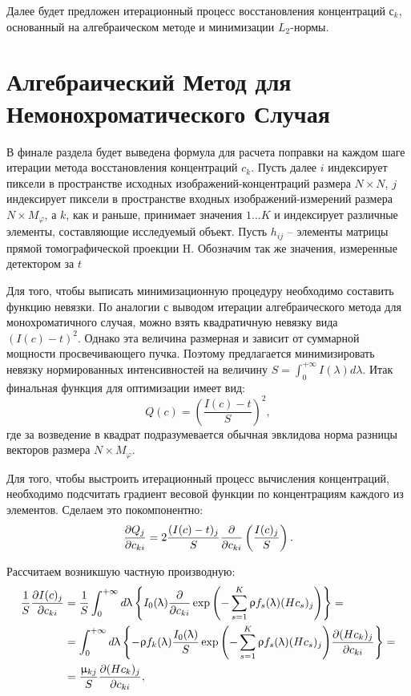 Далее будет предложен итерационный процесс восстановления концентраций $с_k$, основанный на алгебраическом методе и минимизации $L_2$-нормы.

\section{Алгебраический Метод для Немонохроматического Случая}

В финале раздела будет выведена формула для расчета поправки на каждом шаге итерации метода восстановления концентраций $c_k$.
Пусть далее $i$ индексирует пиксели в пространстве исходных изображений-концентраций размера $N \times N$, $j$ индексирует пиксели в пространстве входных изображений-измерений размера $N \times M_\varphi$, а $k$, как и раньше, принимает значения $1 \dots K$ и индексирует различные элементы, составляющие исследуемый объект.
Пусть $h_{ij}$ – элементы матрицы прямой томографической проекции H.
Обозначим так же значения, измеренные детектором за $t$

Для того, чтобы выписать минимизационную процедуру необходимо составить функцию невязки.
По аналогии с выводом итерации алгебраического метода для монохроматичного случая, можно взять квадратичную невязку вида $(I(c) - t)^2$.
Однако эта величина размерная и зависит от суммарной мощности просвечивающего пучка.
Поэтому предлагается минимизировать невязку нормированных интенсивностей на величину $ S = \int_0^{+\infty}{I(\lambda)d\lambda}$.
Итак финальная функция для оптимизации имеет вид:
\begin{equation}
\label{eq:white_cost_function}
Q(c) = \left(\frac{I(c) - t}{S}\right)^2,
\end{equation} 
где за возведение в квадрат подразумевается обычная эвклидова норма разницы векторов размера $N \times M_\varphi$.

Для того, чтобы выстроить итерационный процесс вычисления концентраций, необходимо подсчитать градиент весовой функции по концентрациям каждого из элементов. 
Сделаем это покомпонентно:
\begin{equation}
  \notag
  \frac {\partial Q_j} {\partial c_{ki}} = 
  2 \frac {(I(c) - t)_j} {S} 
  \frac {\partial } {\partial c_{ki}}
  \left( \frac {I(c)_j} {S} \right).
\end{equation}

Рассчитаем возникшую частную производную:
\begin{equation}
  \notag
  \begin{split}
  \frac 1 S
  \frac {\partial I(c)_j} {\partial c_{ki}} &= 
  \frac 1 S
  \int_0^{+\infty} {d\lambda \left\{
    I_0(\lambda) 
    \frac \partial {\partial c_{ki}}
    \exp{\left(
      -\sum_{s=1}^K {\rho f_s(\lambda) (H c_s)_j} 
      \right)}
    \right\}} = \\
  &= 
  \int_0^{+\infty} {d\lambda \left\{
    -\rho f_k(\lambda) 
    \frac {I_0(\lambda)} {S}
    \exp{\left(
      -\sum_{s=1}^K {\rho f_s(\lambda) (H c_s)_j} 
         \right)}
    \frac {\partial (H c_k)_j} {\partial c_{ki}}
    \right\}} = \\
  &= 
  \frac {\mu_{kj}} {S} \frac {\partial (H c_k)_j} {\partial c_{ki}},
  \end{split}
\end{equation}

